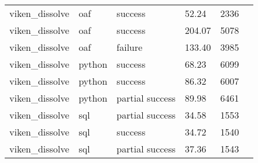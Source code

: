 \begin{longtable}{lp{1.8cm}p{1.8cm}p{1.8cm}p{1.8cm}p{1.8cm}}
    viken\_dissolve            & oaf                          & success          & 52.24                         & 2336            \\
    viken\_dissolve            & oaf                          & success          & 204.07                        & 5078            \\
    viken\_dissolve            & oaf                          & failure          & 133.40                        & 3985            \\
    viken\_dissolve            & python                       & success          & 68.23                         & 6099            \\
    viken\_dissolve            & python                       & success          & 86.32                         & 6007            \\
    viken\_dissolve            & python                       & partial success  & 89.98                         & 6461            \\
    viken\_dissolve            & sql                          & partial success  & 34.58                         & 1553            \\
    viken\_dissolve            & sql                          & success          & 34.72                         & 1540            \\
    viken\_dissolve            & sql                          & partial success  & 37.36                         & 1543            \\
\end{longtable}
